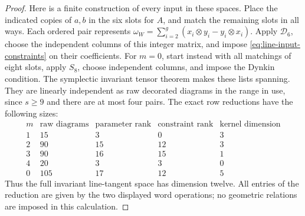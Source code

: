 \begin{proof}
Here is a finite construction of every input in these
spaces. Place the indicated copies of $a,b$ in the six
slots for $A$, and match the remaining slots in all ways.
Each ordered pair represents
$\omega_W=\sum_{i=2}^g(x_i\otimes y_i-y_i\otimes x_i)$.
Apply $\mathcal D_6$, choose the independent columns of
this integer matrix, and impose
\eqref{eq:line-input-constraints} on their coefficients.
For $m=0$, start instead with all matchings of eight slots,
apply $S_8$, choose independent columns, and impose the
Dynkin condition. The symplectic invariant tensor theorem
\cite[Proposition~2.1, author p.~8]{MSS2015}
makes these lists spanning. They are linearly independent
as raw decorated diagrams in the range in use, since
$s\geq9$ and there are at most four pairs.
The exact row reductions have the following sizes:
\[
\begin{array}{c|rrrr}
m&\text{raw diagrams}&\text{parameter rank}&
       \text{constraint rank}&\text{kernel dimension}\\\hline
1&15&3&0&3\\
2&90&15&12&3\\
3&90&16&15&1\\
4&20&3&3&0\\
0&105&17&12&5
\end{array}
\]
Thus the full invariant line-tangent space has dimension
twelve. All entries of the reduction are given by the
two displayed word operations; no geometric relations
are imposed in this calculation.


\end{proof}
